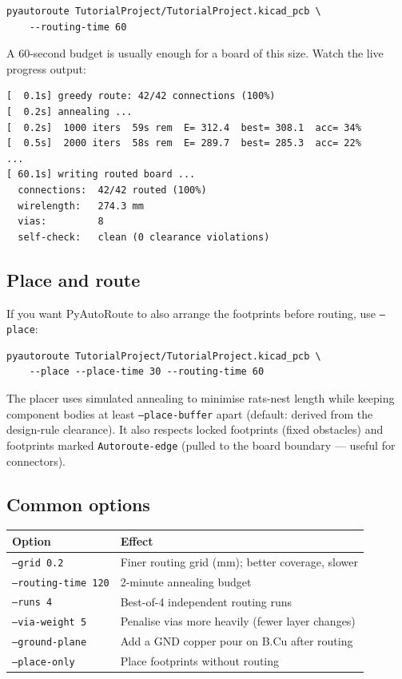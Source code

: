 \documentclass[11pt,a4paper]{article}
\begin{document}
\begin{lstlisting}
pyautoroute TutorialProject/TutorialProject.kicad_pcb \
    --routing-time 60
\end{lstlisting}

A 60-second budget is usually enough for a board of this size.
Watch the live progress output:

\begin{lstlisting}
[  0.1s] greedy route: 42/42 connections (100%)
[  0.2s] annealing ...
[  0.2s]  1000 iters  59s rem  E= 312.4  best= 308.1  acc= 34%
[  0.5s]  2000 iters  58s rem  E= 289.7  best= 285.3  acc= 22%
...
[ 60.1s] writing routed board ...
  connections:  42/42 routed (100%)
  wirelength:   274.3 mm
  vias:         8
  self-check:   clean (0 clearance violations)
\end{lstlisting}

\subsection{Place and route}

If you want PyAutoRoute to also arrange the footprints before routing,
use \texttt{--place}:

\begin{lstlisting}
pyautoroute TutorialProject/TutorialProject.kicad_pcb \
    --place --place-time 30 --routing-time 60
\end{lstlisting}

The placer uses simulated annealing to minimise rats-nest length while
keeping component bodies at least \texttt{--place-buffer} apart
(default: derived from the design-rule clearance). It also respects
locked footprints (fixed obstacles) and footprints marked
\texttt{Autoroute-edge} (pulled to the board boundary --- useful for
connectors).

\subsection{Common options}

\begin{center}
\begin{tabular}{ll}
    \toprule
    \textbf{Option} & \textbf{Effect} \\
    \midrule
    \texttt{--grid 0.2}         & Finer routing grid (mm); better coverage, slower \\
    \texttt{--routing-time 120} & 2-minute annealing budget \\
    \texttt{--runs 4}           & Best-of-4 independent routing runs \\
    \texttt{--via-weight 5}     & Penalise vias more heavily (fewer layer changes) \\
    \texttt{--ground-plane}     & Add a GND copper pour on B.Cu after routing \\
    \texttt{--place-only}       & Place footprints without routing \\
    \bottomrule
\end{tabular}
\end{center}
\end{document}

